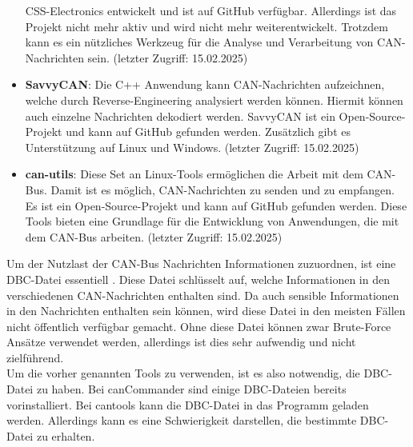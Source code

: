 \begin{itemize}
    CSS-Electronics entwickelt und ist auf GitHub verfügbar. Allerdings ist das Projekt nicht mehr aktiv und wird nicht mehr
    weiterentwickelt. Trotzdem kann es ein nützliches Werkzeug für die Analyse und Verarbeitung von CAN-Nachrichten sein. 
    \cite{can_decoder} (letzter Zugriff: 15.02.2025)
    \item \textbf{SavvyCAN}: Die C++ Anwendung kann CAN-Nachrichten aufzeichnen, welche durch Reverse-Engineering analysiert werden können.
    Hiermit können auch einzelne Nachrichten dekodiert werden. SavvyCAN ist ein Open-Source-Projekt und kann auf GitHub gefunden werden. Zusätzlich
    gibt es Unterstützung auf Linux und Windows. \cite{SavvyCAN} (letzter Zugriff: 15.02.2025)
    \item \textbf{can-utils}: Diese Set an Linux-Tools ermöglichen die Arbeit mit dem CAN-Bus. Damit ist es möglich, CAN-Nachrichten zu senden und zu empfangen.
    Es ist ein Open-Source-Projekt und kann auf GitHub gefunden werden. Diese Tools bieten eine Grundlage für die Entwicklung von Anwendungen, die mit dem CAN-Bus arbeiten.
    \cite{can-utils} (letzter Zugriff: 15.02.2025)
\end{itemize}
Um der Nutzlast der CAN-Bus Nachrichten Informationen zuzuordnen, ist eine DBC-Datei essentiell \cite{Choi2021}. 
Diese Datei schlüsselt auf, welche Informationen in den verschiedenen CAN-Nachrichten enthalten sind.
Da auch sensible Informationen in den Nachrichten enthalten sein können, wird diese Datei in den meisten 
Fällen nicht öffentlich verfügbar gemacht. Ohne diese Datei können zwar Brute-Force Ansätze verwendet werden,
allerdings ist dies sehr aufwendig und nicht zielführend. \\
Um die vorher genannten Tools zu verwenden, ist es also notwendig, die DBC-Datei zu haben. Bei canCommander
sind einige DBC-Dateien bereits vorinstalliert. Bei cantools kann die DBC-Datei in das Programm geladen werden.
Allerdings kann es eine Schwierigkeit darstellen, die bestimmte DBC-Datei zu erhalten.